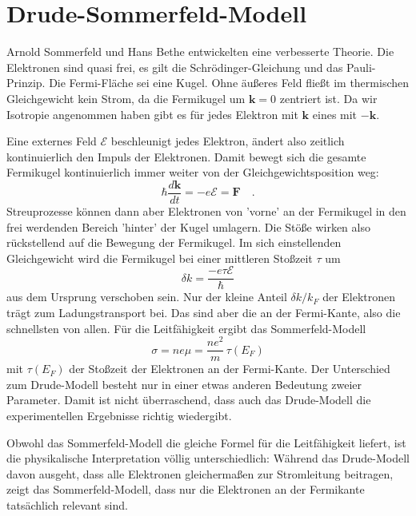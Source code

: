 \section{Drude-Sommerfeld-Modell}

Arnold Sommerfeld und Hans Bethe entwickelten eine verbesserte Theorie. Die Elektronen sind quasi frei, es gilt die Schrödinger-Gleichung und das Pauli-Prinzip. Die Fermi-Fläche sei eine Kugel.
Ohne äußeres Feld fließt im thermischen Gleichgewicht kein Strom, da die Fermikugel um $\mathbf{k} = 0$ zentriert ist. Da wir Isotropie angenommen haben gibt es für jedes Elektron mit $\mathbf{k}$ eines mit $-\mathbf{k}$.

Eine externes Feld $\bm{\mathcal{E}}$ beschleunigt jedes Elektron, ändert also zeitlich kontinuierlich den Impuls der Elektronen. Damit bewegt sich  die gesamte Fermikugel kontinuierlich immer weiter von der Gleichgewichtsposition weg:
\begin{equation}
   \hbar \frac{d \mathbf{k}}{dt} = -e \bm{\mathcal{E}} = \mathbf{F} \quad .
\end{equation}
Streuprozesse können dann aber Elektronen von 'vorne' an der Fermikugel in den frei werdenden Bereich 'hinter' der Kugel umlagern. Die Stöße wirken also rückstellend auf die Bewegung der Fermikugel. Im sich einstellenden Gleichgewicht wird die Fermikugel bei einer mittleren Stoßzeit $\tau$  um 
\begin{equation}
 \delta k = \frac{-e \tau \mathcal{E}}{\hbar}     
\end{equation}  
aus dem Ursprung verschoben sein. Nur der kleine Anteil $\delta k / k_F$ der Elektronen trägt zum Ladungstransport bei. Das sind aber die an der Fermi-Kante, also die schnellsten von allen. Für die Leitfähigkeit ergibt das Sommerfeld-Modell 
\begin{equation}
   \sigma = n e \mu  = \frac{n e^2 }{m} \, \tau(E_F)
\end{equation}
mit $\tau(E_F)$ der Stoßzeit der Elektronen an der Fermi-Kante. Der Unterschied zum Drude-Modell besteht nur in einer etwas anderen Bedeutung zweier Parameter. Damit ist nicht überraschend, dass auch das Drude-Modell die experimentellen Ergebnisse richtig wiedergibt.

Obwohl das Sommerfeld-Modell die gleiche Formel für die Leitfähigkeit liefert, ist die physikalische Interpretation völlig unterschiedlich: Während das Drude-Modell davon ausgeht, dass alle Elektronen gleichermaßen zur Stromleitung beitragen, zeigt das Sommerfeld-Modell, dass nur die Elektronen an der Fermikante tatsächlich relevant sind.

